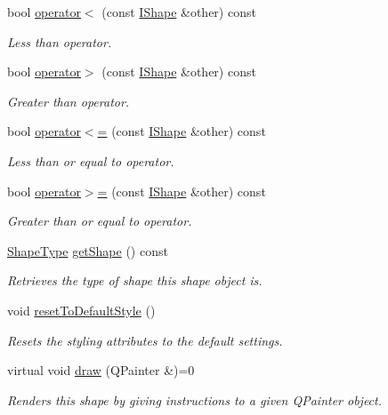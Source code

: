 \begin{DoxyCompactItemize}
bool \mbox{\hyperlink{class_i_shape_aea5cdca9613598dbfff8c7d2eb512cea}{operator$<$}} (const \mbox{\hyperlink{class_i_shape}{I\+Shape}} \&other) const
\begin{DoxyCompactList}\small\item\em Less than operator. \end{DoxyCompactList}\item 
bool \mbox{\hyperlink{class_i_shape_a95d2cf58e5264e4e4bf1af65a383760c}{operator$>$}} (const \mbox{\hyperlink{class_i_shape}{I\+Shape}} \&other) const
\begin{DoxyCompactList}\small\item\em Greater than operator. \end{DoxyCompactList}\item 
bool \mbox{\hyperlink{class_i_shape_a7cb22874dc0be6b43b79a94c88c3578a}{operator$<$=}} (const \mbox{\hyperlink{class_i_shape}{I\+Shape}} \&other) const
\begin{DoxyCompactList}\small\item\em Less than or equal to operator. \end{DoxyCompactList}\item 
bool \mbox{\hyperlink{class_i_shape_ac05b13d61818afc793cb0387703a0998}{operator$>$=}} (const \mbox{\hyperlink{class_i_shape}{I\+Shape}} \&other) const
\begin{DoxyCompactList}\small\item\em Greater than or equal to operator. \end{DoxyCompactList}\item 
\mbox{\hyperlink{class_i_shape_a8f50993477b5ddb44c0547ef3d547cdc}{Shape\+Type}} \mbox{\hyperlink{class_i_shape_a92764c3d0b0d12f0f1296cf1e3a392a8}{get\+Shape}} () const
\begin{DoxyCompactList}\small\item\em Retrieves the type of shape this shape object is. \end{DoxyCompactList}\item 
void \mbox{\hyperlink{class_i_shape_a3f1e70475296c2e897df28a7facb5bad}{reset\+To\+Default\+Style}} ()
\begin{DoxyCompactList}\small\item\em Resets the styling attributes to the default settings. \end{DoxyCompactList}\item 
virtual void \mbox{\hyperlink{class_i_shape_ad97c626e7e2c9afb9f51efc41b836e6f}{draw}} (Q\+Painter \&)=0
\begin{DoxyCompactList}\small\item\em Renders this shape by giving instructions to a given Q\+Painter object. \end{DoxyCompactList}\item 

\end{DoxyCompactItemize}
